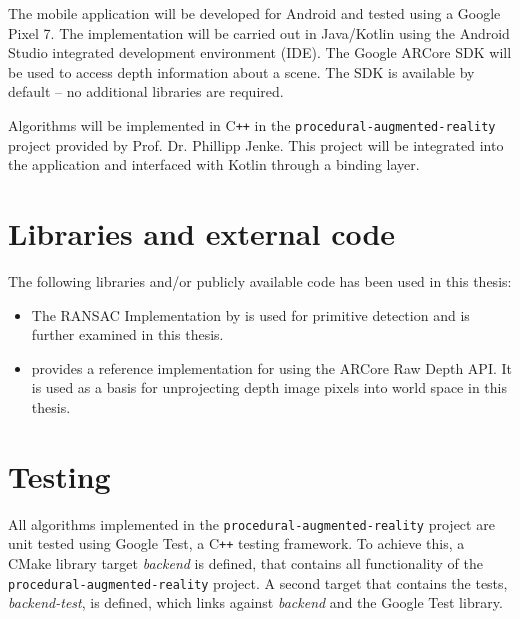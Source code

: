 The mobile application will be developed for Android and tested using a Google Pixel 7.
The implementation will be carried out in Java/Kotlin using the Android Studio integrated development environment (IDE).
The Google ARCore SDK will be used to access depth information about a scene.
The SDK is available by default -- no additional libraries are required.

Algorithms will be implemented in C\texttt{++} in the \texttt{procedural-augmented-reality} project provided by Prof. Dr. Phillipp Jenke.
This project will be integrated into the application and interfaced with Kotlin through a binding layer.

\section{Libraries and external code}
The following libraries and/or publicly available code has been used in this thesis:
\begin{itemize}
    \item The RANSAC Implementation by \citeauthor{schnabel_efficient_2007} is used for primitive detection
    and is further examined in this thesis. \parencite{schnabel_efficient_2007}
    \item {} provides a reference implementation for using the ARCore Raw Depth API.
    It is used as a basis for unprojecting depth image pixels into world space in this thesis.~\parencite{google_llc_codelab_raw_depth}
\end{itemize}


\section{Testing}

All algorithms implemented in the \texttt{procedural-augmented-reality} project are unit tested using
Google Test, a C\texttt{++} testing framework.
To achieve this, a CMake library target \textit{backend} is defined,
that contains all functionality of the \texttt{procedural-augmented-reality} project.
A second target that contains the tests, \textit{backend-test}, is defined,
which links against \textit{backend} and the Google Test library.